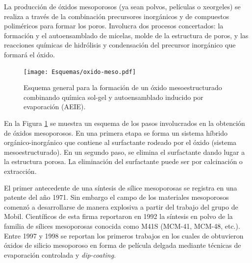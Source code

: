 	La producción de óxidos mesoporosos (ya sean polvos, películas o xeorgeles) se realiza a través de la combinación precursores inorgánicos y de compuestos poliméricos para formar los poros. Involucra dos procesos concertados: la formación y el autoensamblado de micelas, molde de la estructura de poros, y las reacciones químicas de hidrólisis y condensación del precursor inorgánico que formará el óxido. 

				\begin{figure}[h!]
 				\begin{center}
 				\texttt{[image: Esquemas/oxido-meso.pdf]}
 				\caption[Esquema general para la formación de un óxido mesoestructurado]{Esquema general para la formación de un óxido mesoestructurado combinando química sol-gel y autoensamblado inducido por evaporación (AEIE).}
 		   		\label{fig:oxmeso}
 		    	\end{center}
 		    	\end{figure}

	\pagebreak En la Figura \ref{fig:oxmeso} se muestra un esquema de los pasos involucrados en la obtención de óxidos mesoporosos. En una primera etapa se forma un sistema híbrido orgánico-inorgánico que contiene al surfactante rodeado por el óxido (sistema mesoestructurado). En un segundo paso, se elimina el surfactante dando lugar a la estructura porosa. La eliminación del surfactante puede ser por calcinación o extracción.

		 

    El primer antecedente de una síntesis de sílice mesoporosas se registra en una patente del año 1971. Sin embargo el campo de los materiales mesoporosos comenzó a desarrollarse de manera explosiva a partir del trabajo del grupo de Mobil. Científicos de esta firma reportaron en 1992 la síntesis en polvo de la familia de sílices mesoporosas conocida como M41S (MCM-41, MCM-48, etc.). Entre 1997 y 1998 se reportan los primeros trabajos en los cuales de obtuvieron óxidos de silicio mesoporoso en forma de película delgada mediante técnicas de evaporación controlada y \textit{dip-coating}.\cite{Lu1997,Zhao1998a,Zhao1998,Brinker1999} 

